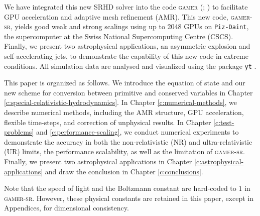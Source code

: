 We have integrated this new SRHD solver into the code \textsc{gamer}
(\citealt{gamer-1}; \citealt{gamer-2}) to facilitate GPU acceleration and adaptive mesh
refinement (AMR). This new code, \textsc{gamer-sr}, yields good weak and strong
scalings using up to 2048 GPUs on \texttt{Piz-Daint}, the supercomputer at the Swiss
National Supercomputing Centre (CSCS). Finally, we present two astrophysical applications,
an asymmetric explosion and self-accelerating jets, to demonstrate the capability of
this new code in extreme conditions. All simulation data are analysed and visualized
using the package \texttt{yt} \citep{YT}.

This paper is organized as follows. We introduce the equation of state and our new scheme
for conversion between primitive and conserved variables in Chapter
\ref{c:special-relativistic-hydrodynamics}. In Chapter \ref{c:numerical-methods}, we describe
numerical methods, including the AMR structure, GPU acceleration, flexible time-steps,
and correction of unphysical results. In Chapter \ref{c:test-problems} and
\ref{c:performance-scaling}, we conduct numerical experiments to demonstrate the accuracy in
both the non-relativistic (NR) and ultra-relativistic (UR) limits, the performance scalability,
as well as the limitation of \textsc{gamer-sr}. Finally, we present two astrophysical
applications in Chapter \ref{c:astrophysical-applications} and draw the
conclusion in Chapter \ref{c:conclusions}.

Note that the speed of light and the Boltzmann constant are hard-coded to
$1$ in \textsc{gamer-sr}. However, these physical constants are retained in this paper,
except in Appendices, for dimensional consistency.
